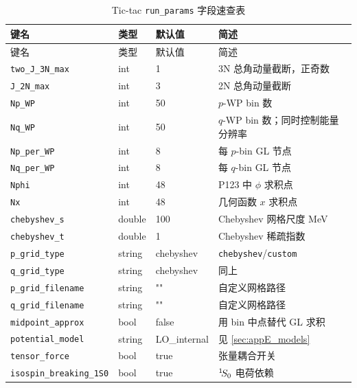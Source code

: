\begin{longtable}{lll@{\hskip 1em}p{4.7cm}}
\caption{Tic-tac \texttt{run\_params} 字段速查表}
\label{tab:appE_quickref}\\
\toprule
键名 & 类型 & 默认值 & 简述 \\
\midrule
\endfirsthead
\toprule
键名 & 类型 & 默认值 & 简述 \\
\midrule
\endhead
\texttt{two\_J\_3N\_max}             & int    & 1            & 3N 总角动量截断，正奇数 \\
\texttt{J\_2N\_max}                 & int    & 3            & 2N 总角动量截断 \\
\texttt{Np\_WP}                    & int    & 50           & \(p\)-WP bin 数 \\
\texttt{Nq\_WP}                    & int    & 50           & \(q\)-WP bin 数；同时控制能量分辨率 \\
\texttt{Np\_per\_WP}                & int    & 8            & 每 \(p\)-bin GL 节点 \\
\texttt{Nq\_per\_WP}                & int    & 8            & 每 \(q\)-bin GL 节点 \\
\texttt{Nphi}                     & int    & 48           & P123 中 \(\phi\) 求积点 \\
\texttt{Nx}                       & int    & 48           & 几何函数 \(x\) 求积点 \\
\texttt{chebyshev\_s}              & double & 100          & Chebyshev 网格尺度 \si{MeV} \\
\texttt{chebyshev\_t}              & double & 1            & Chebyshev 稀疏指数 \\
\texttt{p\_grid\_type}              & string & chebyshev    & \texttt{chebyshev}/\texttt{custom} \\
\texttt{q\_grid\_type}              & string & chebyshev    & 同上 \\
\texttt{p\_grid\_filename}          & string & ""           & 自定义网格路径 \\
\texttt{q\_grid\_filename}          & string & ""           & 自定义网格路径 \\
\texttt{midpoint\_approx}          & bool   & false        & 用 bin 中点替代 GL 求积 \\
\texttt{potential\_model}          & string & LO\_internal & 见 \cref{sec:appE_models} \\
\texttt{tensor\_force}             & bool   & true         & 张量耦合开关 \\
\texttt{isospin\_breaking\_1S0}     & bool   & true         & \({}^{1}\!S_{0}\) 电荷依赖 \\

\end{longtable}
